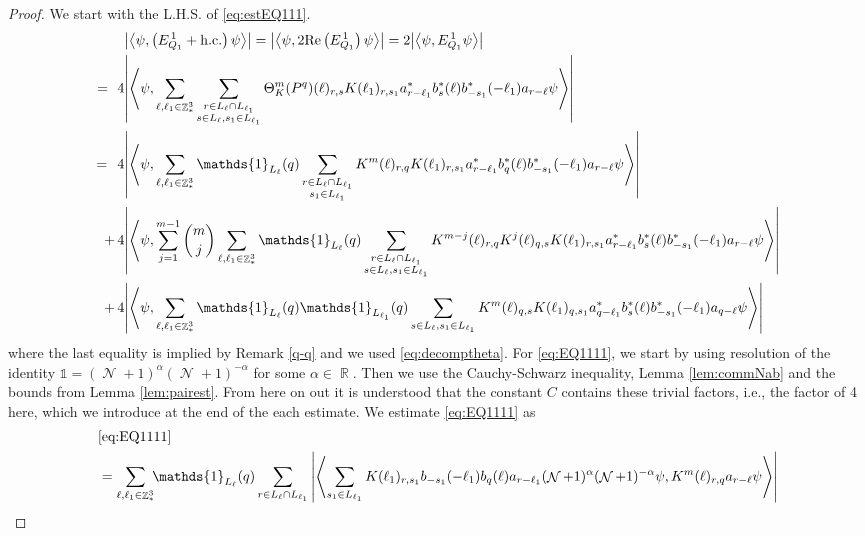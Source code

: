 \documentclass[sn-mathphys, Numbered ,a4paper]{sn-jnl}%
\DeclareMathOperator{\R}{\mathbb{R}}
\DeclareMathOperator{\Z}{\mathbb{Z}}
\DeclareMathOperator{\NN}{\mathcal{N}}
\newcommand{\eva}[1]{\left\langle #1 \right\rangle}
\theoremstyle{plain}
\theoremstyle{definition}
\theoremstyle{remark}
\theoremstyle{plain}
\theoremstyle{definition}
\theoremstyle{remark}
\begin{document}
\begin{proof}We start with the L.H.S. of \eqref{eq:estEQ111}.
\begin{align}
	&\abs{\eva{\psi,\left(E^{\,1}_{Q_1}+\mathrm{h.c.}\right) \psi }} = \abs{\eva{\psi,2\mathrm{Re}\left(E^{\,1}_{Q_1}\right) \psi }} = 2\abs{\eva{\psi, E^{\,1}_{Q_1} \psi }}\nonumber\\
	=\,\:4&\abs{\eva{\psi, \sum\limits_{\ell, \ell_1\in \Z^3_*}\sum\limits_{\substack{r\in L_{\ell} \cap L_{\ell_1}\\  s \in L_{\ell}, s_1\in L_{\ell_1}}} \Theta^m_{K}(P^q)(\ell)_{r,s} K(\ell_1)_{r,s_1} a^*_{r-\ell_1} b^*_{s}(\ell) b^*_{-s_1}(-\ell_1) a_{r-\ell} \psi }} \nonumber\\
	=\,\;4& \abs{\eva{\psi,\sum\limits_{\ell, \ell_1\in \Z^3_*} \mathds{1}_{L_{\ell}}(q) \sum\limits_{\substack{r\in L_{\ell} \cap L_{\ell_1}\\s_1\in L_{\ell_1}}} K^m(\ell )_{r,q} K(\ell_1)_{r,s_1} a^*_{r-\ell_1} b^*_{q}(\ell) b^*_{-s_1}(-\ell_1) a_{r-\ell} \psi }}\label{eq:EQ1111}\\
	+\,4&   \abs{\eva{\psi, \sum\limits_{j=1}^{m-1} {{m}\choose j} \sum\limits_{\ell, \ell_1\in \Z^3_*}\mathds{1}_{L_{\ell}}(q) \sum\limits_{\substack{r\in L_{\ell} \cap L_{\ell_1}\\ s \in L_{\ell},s_1\in L_{\ell_1}}} K^{m-j}(\ell)_{r,q} K^{j}(\ell)_{q,s} K(\ell_1)_{r,s_1} a^*_{r-\ell_1} b^*_{s}(\ell) b^*_{-s_1}(-\ell_1) a_{r-\ell} \psi }}\label{eq:EQ1112}\\
	+\,4& \abs{\eva{\psi, \sum\limits_{\ell, \ell_1\in \Z^3_*} \mathds{1}_{L_{\ell}}(q) \mathds{1}_{L_{\ell_1}}(q) \sum\limits_{s \in L_{\ell},s_1\in L_{\ell_1}} K^m(\ell)_{q,s}K(\ell_1)_{q,s_1}
	a^*_{q-\ell_1}b^*_{s}(\ell) b^*_{-s_1}(-\ell_1)a_{q-\ell} \psi }}\label{eq:EQ1113}
\end{align}
where the last equality is implied by Remark \ref{q-q} and we used \eqref{eq:decomptheta}.
For \eqref{eq:EQ1111}, we start by using resolution of the identity $\mathds{1} = (\NN+1)^{\alpha}(\NN+1)^{-\alpha}$ for some $\alpha \in \R$. Then we use the Cauchy-Schwarz inequality, Lemma \ref{lem:commNab} and the bounds from Lemma \ref{lem:pairest}.  From here on out it is understood that the constant $C$ contains these trivial factors, i.e., the factor of 4 here, which we introduce at the end of the each estimate. We estimate \eqref{eq:EQ1111} as 
\begin{align}
	&\eqref{eq:EQ1111}\nonumber\\
    &= \sum\limits_{\ell,\ell_1  \in \Z^3_*}\!\! \mathds{1}_{L_\ell}(q) \sum\limits_{r \in L_\ell \cap L_{\ell_1}} \abs{\eva{ \sum\limits_{s_1 \in L_{\ell_1}} K(\ell_1)_{r,s_1} b_{-s_1}(-\ell_1) b_{q}(\ell) a_{r-\ell_1} (\NN+1)^{\alpha} (\NN+1)^{-\alpha} \psi,  K^{m}(\ell)_{r,q} a_{r-\ell} \psi }}\nonumber\\

\end{align}
\end{proof}
\end{document}
